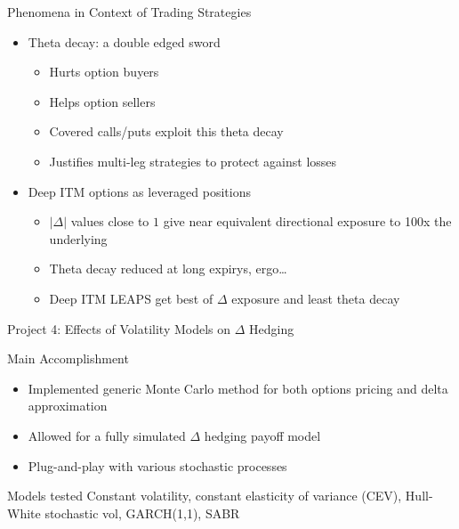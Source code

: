 \documentclass[presentation]{beamer}
\begin{document}
\begin{frame}[label={sec:orge5b486e}]{Phenomena in Context of Trading Strategies}
\begin{itemize}
\item Theta decay: a double edged sword
\begin{itemize}
\item \alert{Hurts} option buyers
\item \alert{Helps} option sellers
\item Covered calls/puts exploit this theta decay
\item Justifies multi-leg strategies to protect against losses
\end{itemize}
\end{itemize}


\begin{itemize}
\item Deep ITM options as leveraged  positions
\begin{itemize}
\item \(|\Delta |\) values close to \(1\) give near equivalent directional exposure to 100x the underlying
\item Theta decay reduced at long expirys, ergo\ldots{}
\item Deep ITM LEAPS get best of \(\Delta\) exposure and least theta decay
\end{itemize}
\end{itemize}
\end{frame}
\begin{frame}[label={sec:org04b22c4}]{Project 4: Effects of Volatility Models on \(\Delta\) Hedging}
\begin{block}{Main Accomplishment}
\begin{itemize}
\item Implemented \alert{generic Monte Carlo method} for both options pricing and delta approximation
\item Allowed for a fully simulated \(\Delta\) hedging payoff model
\item Plug-and-play with various stochastic processes
\end{itemize}
\pause
\end{block}
\begin{block}{Models tested}
Constant volatility, constant elasticity of variance (CEV), Hull-White stochastic vol, GARCH(1,1), SABR
\end{block}
\end{frame}
\end{document}
